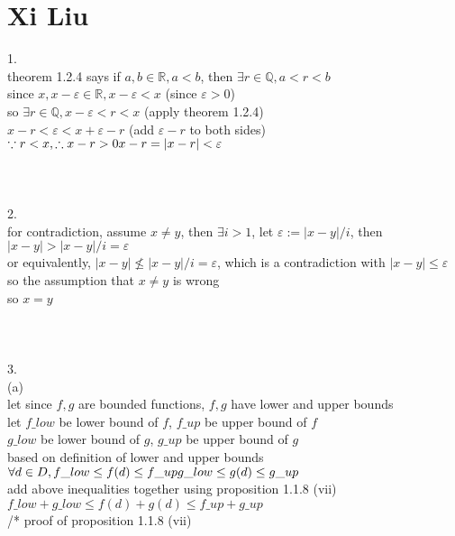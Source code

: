 \documentclass[12pt, border = 4pt, multi]{article} %
\begin{document}
\section*{Xi Liu}
1.\\
theorem 1.2.4 says if $a, b \in \mathbb{R}, a < b$, then $\exists r \in \mathbb{Q}, a < r < b$\\
since $x, x - \varepsilon \in \mathbb{R}, x - \varepsilon < x$ \qquad (since $\varepsilon > 0$)\\
so $\exists r \in \mathbb{Q}, x - \varepsilon < r < x$ \qquad (apply theorem 1.2.4)\\
$x - r < \varepsilon < x + \varepsilon - r$ \qquad (add $\varepsilon - r$ to both sides)\\
$\because r < x, \therefore x - r > 0\\
x - r = |x - r| < \varepsilon$\\
\\
\\
\\
2.\\
for contradiction, assume $x \not= y$, then $\exists i > 1$, let $\varepsilon := |x - y| / i$, then $|x - y| > |x - y| / i = \varepsilon$\\
or equivalently, $|x - y| \not\leq |x - y| / i = \varepsilon$, which is a contradiction with $|x - y| \leq \varepsilon$\\
so the assumption that $x \not= y$ is wrong\\
so $x = y$\\
\\
\\
\\
3.\\
(a)\\
let since $f, g$ are bounded functions, $f, g$ have lower and upper bounds\\
let $f\_low$ be lower bound of $f$, $f\_up$ be upper bound of $f$\\
$g\_low$ be lower bound of $g$, $g\_up$ be upper bound of $g$\\
based on definition of lower and upper bounds\\
$\forall d \in D, f\_low \leq f(d) \leq f\_up\\
g\_low \leq g(d) \leq g\_up$\\
add above inequalities together using proposition 1.1.8 (vii)\\ 
$f\_low + g\_low \leq f(d) + g(d) \leq f\_up + g\_up$\\
/* proof of proposition 1.1.8 (vii)\\
\end{document}
